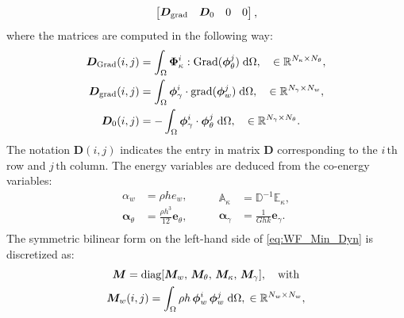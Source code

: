 \documentclass[preprint,12pt]{elsarticle}
\begin{document}
{\begin{equation}
\begin{bmatrix}
\bm{D}_{\mathrm{grad}} & \bm{D}_0 & 0 & 0       \vspace{.3mm}\\
\end{bmatrix},
\end{equation}
where the matrices are computed in the following way:
\begin{equation}
\begin{aligned}
\bm{D}_{\mathrm{Grad}}(i,j) &= \int_{\Omega} \bm{\Phi}_{\kappa}^i : \mathrm{Grad} (\bm{\phi}_{\theta}^j) \d\Omega, \quad \in \mathbb{R}^{N_\kappa \times N_\theta},\\
\bm{D}_{\mathrm{grad}}(i,j) &= \int_{\Omega} \bm{\phi}_{\gamma}^i \cdot  \mathrm{grad}(\bm{\phi}^j_{w}) \d\Omega, \quad \in \mathbb{R}^{N_{\gamma} \times N_w},\\
\bm{D}_0(i,j)  &= -\int_{\Omega} \bm{\phi}_{\gamma}^i \cdot  \bm{\phi}^j_{\theta} \d\Omega, \quad \in \mathbb{R}^{N_{\gamma} \times N_\theta}. \\
\end{aligned}
\end{equation}
The notation $\bm{D}(i,j)$ indicates the entry in matrix $\bm{D}$ corresponding to the $i \, {\text{th}}$ row and $j \,{\text{th}}$ column. The energy variables are deduced from the co-energy variables:
\begin{equation}
\begin{aligned}
\alpha_w &= \rho h e_w, \\
\bm\alpha_{\theta} &=  \frac{\rho h^3}{12} \bm{e}_{\theta}, \\
\end{aligned} \qquad
\begin{aligned}
\mathbb{A}_{\kappa} &= \mathbb{D}^{-1} \mathbb{E}_{\kappa}, \\
\bm\alpha_{\gamma} &= \frac{1}{G h k} \bm{e}_{\gamma}. \\
\end{aligned}
\end{equation}
The symmetric bilinear form on the left-hand side of \eqref{eq:WF_Min_Dyn} is discretized as:
\begin{equation}
	\begin{gathered}
	\bm{M} = \text{diag}[\bm{M}_w,\, \bm{M}_\theta,\, \bm{M}_\kappa,\, \bm{M}_{\gamma}], \quad \text{with} \\
	\begin{aligned}
	&\bm{M}_w(i,j) = \int_{\Omega} \rho h \, \bm{\phi}_w^i \, \bm{\phi}_w^j \d\Omega, \; \in \mathbb{R}^{N_w \times N_w}, \\

\end{aligned}
\end{gathered}
\end{equation}}
\end{document}
